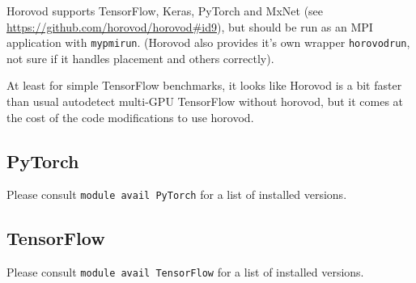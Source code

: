 Horovod supports TensorFlow, Keras, PyTorch and MxNet (see \url{https://github.com/horovod/horovod#id9}), but should be run as an MPI application with \lstinline|mypmirun|.
(Horovod also provides it's own wrapper \lstinline|horovodrun|, not sure if it handles placement and others correctly).

At least for simple TensorFlow benchmarks, it looks like Horovod is a bit faster than usual autodetect multi-GPU TensorFlow without horovod, but it comes at the
cost of the code modifications to use horovod.







\subsection{PyTorch}
\label{sec:gpu_ugent_software_pytorch}

Please consult \lstinline|module avail PyTorch| for a list of installed versions.





\subsection{TensorFlow}
\label{sec:gpu_ugent_software_tensorflow}

Please consult \lstinline|module avail TensorFlow| for a list of installed versions.



